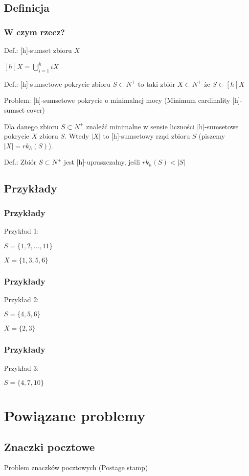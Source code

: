 \documentclass{beamer}
\begin{document}
	\subsection{Definicja}
		\begin{frame} \frametitle{W czym rzecz?}
			Def.: [h]-sumset zbioru $ X $
			
			$ [h]X = \bigcup_{i=1}^{h} iX $
			
			Def.: [h]-sumsetowe pokrycie zbioru $ S \subset N^{+} $ to taki zbiór $ X \subset N^{+} $ że $ S \subset [h]X $
			
			Problem: [h]-sumsetowe pokrycie o minimalnej mocy (Minimum cardinality [h]-sumset cover)
			
			Dla danego zbioru $ S \subset N^{+} $ znaleźć minimalne w sensie liczności [h]-sumsetowe pokrycie $ X $ zbioru $ S $. Wtedy $ |X| $ to [h]-sumsetowy rząd zbioru $ S $ (piszemy $ |X| = rk_{h}(S) $).
			
			Def.: Zbiór $ S \subset N^{+} $ jest [h]-upraszczalny, jeśli $ rk_{h}(S) < |S| $
		\end{frame}
		
	\subsection{Przykłady}
		\begin{frame} \frametitle{Przykłady}
			Przykład 1:
			
			$ S = \lbrace 1,2,...,11 \rbrace $
			
			$ X = \lbrace 1,3,5,6 \rbrace $
		\end{frame}
			
		\begin{frame} \frametitle{Przykłady}
			Przykład 2:
			
			$ S = \lbrace 4,5,6 \rbrace $
			
			$ X = \lbrace 2,3 \rbrace $
		\end{frame}
		
		\begin{frame} \frametitle{Przykłady}		
			Przykład 3:
			
			$ S =  \lbrace 4,7,10 \rbrace $						
		\end{frame}
		
\section{Powiązane problemy}
	\subsection{Znaczki pocztowe}
		\begin{frame}
			Problem znaczków pocztowych (Postage stamp)
		\end{frame}
		
\end{document}
